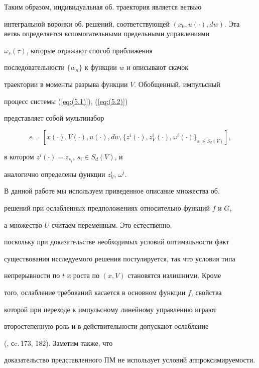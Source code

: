 Таким образом, индивидуальная об. траектория является ветвью


интегральной воронки об. решений, соответствующей $(x_0,u(\cdot),dw


)$. Эта ветвь определяется вспомогательными предельными управлениями


$\omega_s(\tau)$, которые отражают способ приближения


последовательности $\{ w_n\}$ к функции $ w$ и описывают скачок


траектории в моменты разрыва функции $V$. Обобщенный, импульсный


процесс системы (\ref{eq:(5.1)}), (\ref{eq:(5.2)})


представляет собой мультинабор


$$


e=[x(\cdot), V(\cdot),u(\cdot), dw,


\{z^i(\cdot),z_V^i(\cdot),\omega^i(\cdot)\}_{s_i\in S_d(V)}],


$$


в котором $z^i(\cdot)=z_{s_i}$, $s_i\in S_d(V)$, и


аналогично определены функции $z_V^i$, $\omega^i$.





В данной работе мы используем приведенное описание множества об.


решений при ослабленных предположениях относительно функций $f$ и $G$,


а множество $U$ считаем переменным. Это естественно, 


поскольку при доказательстве необходимых условий оптимальности факт


существования исследуемого решения постулируется, так что условия типа


непрерывности по $t$ и роста по $(x,V)$ становятся излишними. Кроме


того, ослабление требований касается в основном функции $f$, свойства


которой при переходе к импульсному линейному управлению играют


второстепенную роль и в действительности допускают ослабление


(\cite{75}, сc.\,173, 182). Заметим также, что


доказательство представленного ПМ не использует условий аппроксимируемости.





